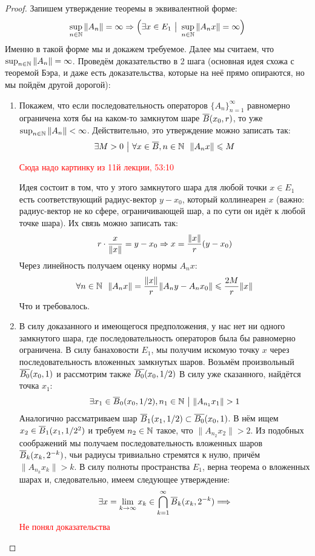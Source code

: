 \begin{proof}
	Запишем утверждение теоремы в эквивалентной форме:
	\[
		\sup_{n \in \mathbb{N}} \|A_n\| = \infty \Rightarrow \Big(\exists x \in E_1 \ \big|\  \sup_{n \in \mathbb{N}} \|A_nx\| = \infty\Big)
	\]
	Именно в такой форме мы и докажем требуемое. Далее мы считаем, что $\sup_{n \in \mathbb{N}} \|A_n\| = \infty$. Проведём доказательство в 2 шага (основная идея схожа с теоремой Бэра, и даже есть доказательства, которые на неё прямо опираются, но мы пойдём другой дорогой):
	\begin{enumerate}
		\item Покажем, что если последовательность операторов $\{A_n\}_{n = 1}^\infty$ равномерно ограничена хотя бы на каком-то замкнутом шаре $\overline{B}(x_0, r)$, то уже $\sup_{n \in \mathbb{N}} \|A_n\| < \infty$. Действительно, это утверждение можно записать так:
		\[
			\exists M > 0 \ \big|\  \forall x \in \overline{B}, n \in \mathbb{N}\ \ \|A_nx\| \leqslant M
		\]
		
		\textcolor{red}{Сюда надо картинку из 11й лекции, 53:10}
		
		Идея состоит в том, что у этого замкнутого шара для любой точки $x \in E_1$ есть соответствующий радиус-вектор $y - x_0$, который коллинеарен $x$ (важно: радиус-вектор не ко сфере, ограничивающей шар, а по сути он идёт к любой точке шара). Их связь можно записать так:
		\[
			r \cdot \frac{x}{\|x\|} = y - x_0 \Rightarrow x = \frac{\|x\|}{r}(y - x_0)
		\]
		Через линейность получаем оценку нормы $A_nx$:
		\[
			\forall n \in \mathbb{N}\ \ \|A_nx\| = \frac{\|x\|}{r}\|A_ny - A_nx_0\| \leqslant \frac{2M}{r}\|x\|
		\]
		Что и требовалось.
		
		\item В силу доказанного и имеющегося предположения, у нас нет ни одного замкнутого шара, где последовательность операторов была бы равномерно ограничена. В силу банаховости $E_1$, мы получим искомую точку $x$ через последовательность вложенных замкнутых шаров. Возьмём произвольный $\overline{B_0}(x_0, 1)$ и рассмотрим также $\overline{B_0}(x_0, 1 / 2)$ В силу уже сказанного, найдётся точка $x_1$:
		\[
			\exists x_1 \in \overline{B}_0(x_0, 1 / 2), n_1 \in \mathbb{N} \ \big|\  \|A_{n_1}x_1\| > 1
		\]
		Аналогично рассматриваем шар $\overline{B}_1(x_1, 1 / 2) \subset \overline{B_0}(x_0, 1)$. В нём ищем $x_2 \in \overline{B}_1(x_1, 1 / 2^2)$ и требуем $n_2 \in \mathbb{N}$ такое, что $\|A_{n_2}x_2\| > 2$. Из подобных соображений мы получаем последовательность вложенных шаров $\overline{B}_k(x_k, 2^{-k})$, чьи радиусы тривиально стремятся к нулю, причём $\|A_{n_k}x_k\| > k$. В силу полноты пространства $E_1$, верна теорема о вложенных шарах и, следовательно, имеем следующее утверждение:
		\[
			\exists x = \lim_{k \to \infty} x_k \in \bigcap_{k = 1}^\infty \overline{B}_k(x_k, 2^{-k}) \Longrightarrow 
		\]
		\textcolor{red}{Не понял доказательства}
	\end{enumerate}
\end{proof}
